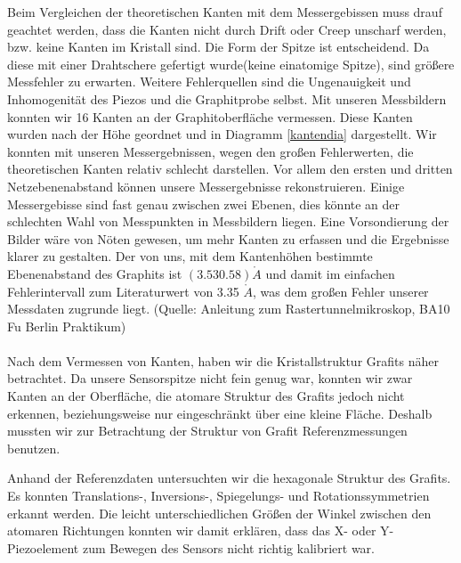 \documentclass[10pt,a4paper]{article}
\begin{document}
Beim Vergleichen der theoretischen Kanten mit dem Messergebissen muss drauf geachtet werden, dass die Kanten nicht durch Drift oder Creep unscharf werden, bzw. keine Kanten im Kristall sind. Die Form der Spitze ist entscheidend. Da diese mit einer Drahtschere gefertigt wurde(keine einatomige Spitze), sind größere Messfehler zu erwarten. Weitere Fehlerquellen sind die Ungenauigkeit und Inhomogenität des Piezos und die Graphitprobe selbst.
Mit unseren Messbildern konnten wir 16 Kanten an der Graphitoberfläche vermessen. Diese Kanten wurden nach der Höhe geordnet und in Diagramm \ref{kantendia} dargestellt. Wir konnten mit unseren Messergebnissen, wegen den großen Fehlerwerten, die theoretischen Kanten relativ schlecht darstellen. Vor allem den ersten und dritten Netzebenenabstand können unsere Messergebnisse rekonstruieren. Einige Messergebisse sind fast genau zwischen zwei Ebenen, dies könnte an der schlechten Wahl von Messpunkten in Messbildern liegen. Eine Vorsondierung der Bilder wäre von Nöten gewesen, um mehr Kanten zu erfassen und die Ergebnisse klarer zu gestalten.
Der von uns, mit dem Kantenhöhen bestimmte Ebenenabstand des Graphits ist $(3.53 0.58)\mathring{A}$ und damit im einfachen Fehlerintervall zum Literaturwert von 3.35 $\mathring{A}$, was dem großen Fehler unserer Messdaten zugrunde liegt. (Quelle: Anleitung zum Rastertunnelmikroskop, BA10 Fu Berlin Praktikum)
\\\\
Nach dem Vermessen von Kanten, haben wir die Kristallstruktur Grafits näher betrachtet. Da unsere Sensorspitze nicht fein genug war, konnten wir zwar Kanten an der Oberfläche, die atomare Struktur des Grafits jedoch nicht erkennen, beziehungsweise nur eingeschränkt über eine kleine Fläche. Deshalb mussten wir zur Betrachtung der Struktur von Grafit Referenzmessungen benutzen.

Anhand der Referenzdaten untersuchten wir die hexagonale Struktur des Grafits. Es konnten Translations-, Inversions-, Spiegelungs- und Rotationssymmetrien erkannt werden. Die leicht unterschiedlichen Größen der Winkel zwischen den atomaren Richtungen konnten wir damit erklären, dass das X- oder Y-Piezoelement zum Bewegen des Sensors nicht richtig kalibriert war.
\end{document}
